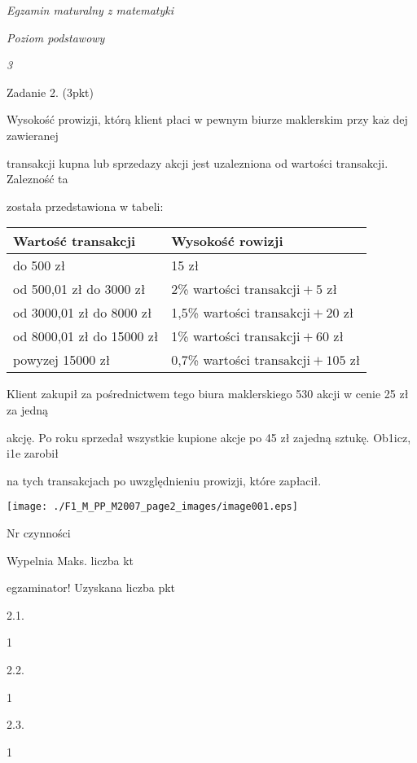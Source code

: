 \documentclass[a4paper,12pt]{article}
\begin{document}
{\it Egzamin maturalny z matematyki}

{\it Poziom podstawowy}

{\it 3}

Zadanie 2. (3pkt)

Wysokość prowizji, którą klient płaci w pewnym biurze maklerskim przy $\mathrm{k}\mathrm{a}\dot{\mathrm{z}}$ dej zawieranej

transakcji kupna lub sprzedaz$\mathrm{y}$ akcji jest uzalezniona od wartości transakcji. Zalezność ta

została przedstawiona w tabeli:
\begin{center}
\begin{tabular}{|l|l|}
\hline
\multicolumn{1}{|l|}{Wartość transakcji}&	\multicolumn{1}{|l|}{Wysokość rowizji}	\\
\hline
\multicolumn{1}{|l|}{do 500 zł}&	\multicolumn{1}{|l|}{15 zł}	\\
\hline
\multicolumn{1}{|l|}{od 500,01 zł do 3000 zł}&	\multicolumn{1}{|l|}{2\% wartości $\mathrm{t}\mathrm{r}\mathrm{a}\mathrm{n}\mathrm{s}\mathrm{a}\mathrm{k}\mathrm{c}\mathrm{j}\mathrm{i}+5$ zł}	\\
\hline
\multicolumn{1}{|l|}{od 3000,01 zł do 8000 zł}&	\multicolumn{1}{|l|}{1,5\% wartości $\mathrm{t}\mathrm{r}\mathrm{a}\mathrm{n}\mathrm{s}\mathrm{a}\mathrm{k}\mathrm{c}\mathrm{j}\mathrm{i}+20$ zł}	\\
\hline
\multicolumn{1}{|l|}{od 8000,01 zł do 15000 zł}&	\multicolumn{1}{|l|}{1\% wartości $\mathrm{t}\mathrm{r}\mathrm{a}\mathrm{n}\mathrm{s}\mathrm{a}\mathrm{k}\mathrm{c}\mathrm{j}\mathrm{i}+60$ zł}	\\
\hline
\multicolumn{1}{|l|}{powyzej 15000 zł}&	\multicolumn{1}{|l|}{0,7\% wartości $\mathrm{t}\mathrm{r}\mathrm{a}\mathrm{n}\mathrm{s}\mathrm{a}\mathrm{k}\mathrm{c}\mathrm{j}\mathrm{i}+105$ zł}	\\
\hline
\end{tabular}

\end{center}
Klient zakupił za pośrednictwem tego biura maklerskiego 530 akcji w cenie 25 zł za jedną

akcję. Po roku sprzedał wszystkie kupione akcje po 45 zł zajedną sztukę. Ob1icz, i1e zarobił

na tych transakcjach po uwzględnieniu prowizji, które zapłacił.
\begin{center}
\texttt{[image: ./F1\_M\_PP\_M2007\_page2\_images/image001.eps]}
\end{center}
Nr czynności

Wypelnia Maks. liczba kt

egzaminator! Uzyskana liczba pkt

2.1.

1

2.2.

1

2.3.

1
\end{document}
